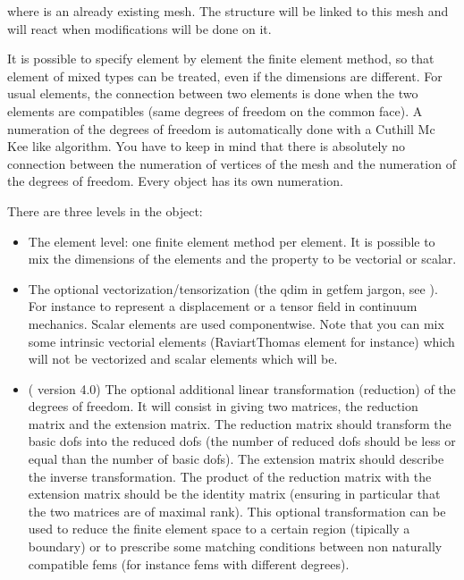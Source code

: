 \documentclass[a4paper,11pt,english]{sphinxmanual}
\begin{document}
\begin{sphinxVerbatim}[commandchars=\\\{\}]
 
\end{sphinxVerbatim}

where  is an already existing mesh. The structure will be linked to this
mesh and will react when modifications will be done on it.

It is possible to specify element by element the finite element method, so that
element of mixed types can be treated, even if the dimensions are different. For
usual elements, the connection between two elements is done when the two elements
are compatibles (same degrees of freedom on the common face). A numeration of the
degrees of freedom is automatically done with a Cuthill Mc Kee like algorithm. You
have to keep in mind that there is absolutely no connection between the numeration
of vertices of the mesh and the numeration of the degrees of freedom. Every
 object has its own numeration.

There are three levels in the  object:
\begin{itemize}
\item {} 
The element level: one finite element method per element. It is possible to mix
the dimensions of the elements and the property to be vectorial or scalar.

\item {} 
The optional vectorization/tensorization (the qdim in getfem jargon,
see ). For instance to represent a displacement or a
tensor field in continuum mechanics. Scalar
elements are used componentwise. Note that you can mix some
intrinsic vectorial elements (Raviart\sphinxhyphen{}Thomas element for instance)
which will not be vectorized and
scalar elements which will be.

\item {} 
( version 4.0) The optional additional linear transformation (reduction) of
the degrees of freedom. It will consist in giving two matrices, the reduction
matrix and the extension matrix. The reduction matrix should transform the basic
dofs into the reduced dofs (the number of reduced dofs should be less or equal
than the number of basic dofs). The extension matrix should describe the inverse
transformation. The product of the reduction matrix with the extension matrix
should be the identity matrix (ensuring in particular that the two matrices are
of maximal rank). This optional transformation can be used to reduce the finite
element space to a certain region (tipically a boundary) or to prescribe some
matching conditions between non naturally compatible fems (for instance fems
with different degrees).

\end{itemize}
\end{document}
